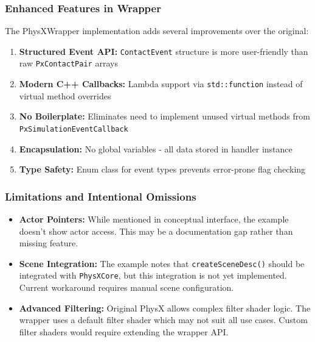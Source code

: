\subsubsection{Enhanced Features in Wrapper}

The PhysXWrapper implementation adds several improvements over the original:

\begin{enumerate}
    \item \textbf{Structured Event API:} \texttt{ContactEvent} structure is more user-friendly than raw \texttt{PxContactPair} arrays
    \item \textbf{Modern C++ Callbacks:} Lambda support via \texttt{std::function} instead of virtual method overrides
    \item \textbf{No Boilerplate:} Eliminates need to implement unused virtual methods from \texttt{PxSimulationEventCallback}
    \item \textbf{Encapsulation:} No global variables - all data stored in handler instance
    \item \textbf{Type Safety:} Enum class for event types prevents error-prone flag checking
\end{enumerate}

\subsubsection{Limitations and Intentional Omissions}

\begin{itemize}
    \item \textbf{Actor Pointers:} While mentioned in conceptual interface, the example doesn't show actor access. This may be a documentation gap rather than missing feature.

    \item \textbf{Scene Integration:} The example notes that \texttt{createSceneDesc()} should be integrated with \texttt{PhysXCore}, but this integration is not yet implemented. Current workaround requires manual scene configuration.

    \item \textbf{Advanced Filtering:} Original PhysX allows complex filter shader logic. The wrapper uses a default filter shader which may not suit all use cases. Custom filter shaders would require extending the wrapper API.
\end{itemize}


